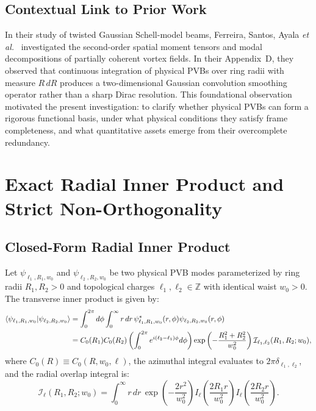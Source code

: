 \documentclass{optica-article}
\begin{document}
\subsection{Contextual Link to Prior Work}

In their study of twisted Gaussian Schell-model beams, Ferreira, Santos, Ayala \emph{et al.}~\cite{Ferreira2026} investigated the second-order spatial moment tensors and modal decompositions of partially coherent vortex fields. In their Appendix~D, they observed that continuous integration of physical PVBs over ring radii with measure $R \, dR$ produces a two-dimensional Gaussian convolution smoothing operator rather than a sharp Dirac resolution. This foundational observation motivated the present investigation: to clarify whether physical PVBs can form a rigorous functional basis, under what physical conditions they satisfy frame completeness, and what quantitative assets emerge from their overcomplete redundancy.

\section{Exact Radial Inner Product and Strict Non-Orthogonality}
\label{sec:inner_product}

\subsection{Closed-Form Radial Inner Product}

Let $\psi_{\ell_1, R_1, w_0}$ and $\psi_{\ell_2, R_2, w_0}$ be two physical PVB modes parameterized by ring radii $R_1, R_2 > 0$ and topological charges $\ell_1, \ell_2 \in \mathbb{Z}$ with identical waist $w_0 > 0$. The transverse inner product is given by:
\begin{align}
\langle \psi_{\ell_1, R_1, w_0} | \psi_{\ell_2, R_2, w_0} \rangle &= \int_0^{2\pi} d\phi \int_0^\infty r \, dr \, \psi_{\ell_1, R_1, w_0}^*(r, \phi) \psi_{\ell_2, R_2, w_0}(r, \phi) \notag \\
&= C_0(R_1) C_0(R_2) \left( \int_0^{2\pi} e^{i(\ell_2 - \ell_1)\phi} d\phi \right) \exp\left( - \frac{R_1^2 + R_2^2}{w_0^2} \right) \mathcal{I}_{\ell_1, \ell_2}(R_1, R_2; w_0),
\label{eq:inner_product_setup}
\end{align}
where $C_0(R) \equiv C_0(R, w_0, \ell)$, the azimuthal integral evaluates to $2\pi \delta_{\ell_1, \ell_2}$, and the radial overlap integral is:
\begin{equation}
\mathcal{I}_\ell(R_1, R_2; w_0) = \int_0^\infty r \, dr \, \exp\left( - \frac{2 r^2}{w_0^2} \right) I_\ell\left( \frac{2 R_1 r}{w_0^2} \right) I_\ell\left( \frac{2 R_2 r}{w_0^2} \right).
\label{eq:radial_overlap_integral}
\end{equation}
\end{document}
